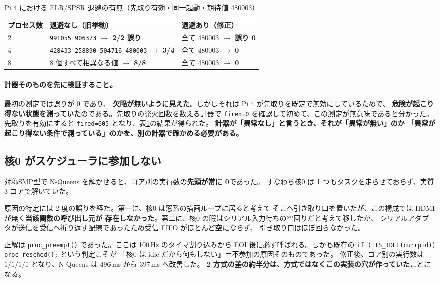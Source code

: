 \documentclass[a4paper,11pt]{ltjsarticle}
\begin{document}
\begin{table}[t]
\centering
\caption{Pi 4 における ELR/SPSR 退避の有無（先取り有効・同一起動・期待値 480003）}
\label{tab:elr}
\begin{tabular}{lll}
\toprule
プロセス数 & 退避なし（旧挙動） & 退避あり（修正） \\
\midrule
2 & \texttt{991055 906373} $\to$ \textbf{2/2 誤り} & 全て 480003 $\to$ \textbf{誤り 0} \\
4 & \texttt{428433 258890 504716 480003} $\to$ \textbf{3/4} & 全て 480003 $\to$ \textbf{0} \\
8 & 8 個すべて相異なる値 $\to$ \textbf{8/8} & 全て 480003 $\to$ \textbf{0} \\
\bottomrule
\end{tabular}
\end{table}

\paragraph{計器そのものを先に検証すること。}最初の測定では誤りが 0 であり、
\textbf{欠陥が無いように見えた}。しかしそれは Pi 4 が先取りを既定で無効にしているためで、
\textbf{危険が起こり得ない状態を測っていた}のである。先取りの発火回数を数える計器で
\texttt{fired=0} を確認して初めて、この測定が無意味であると分かった。
先取りを有効にすると \texttt{fired=605} となり、表\ref{tab:elr}の結果が得られた。
\textbf{計器が「異常なし」と言うとき、それが「異常が無い」のか
「異常が起こり得ない条件で測っている」のかを、別の計器で確かめる必要がある。}

\subsection{核0 がスケジューラに参加しない}
対称SMP型で N-Queens を解かせると、コア別の実行数の\textbf{先頭が常に 0}であった。
すなわち核0 は 1 つもタスクを走らせておらず、実質 3 コアで解いていた。

原因の特定には 2 度の誤りを経た。第一に、核0 は窓系の描画ループに居ると考えて
そこへ引き取り口を置いたが、この構成では HDMI が無く\textbf{当該関数の呼び出し元が
存在しなかった}。第二に、核0 の暇はシリアル入力待ちの空回りだと考えて移したが、
シリアルアダプタが送信を受信へ折り返す配線であったため受信 FIFO がほとんど空にならず、
引き取り口はほぼ回らなかった。

正解は \texttt{proc\_preempt()} であった。ここは 100\,Hz のタイマ割り込みから
EOI 後に必ず呼ばれる。しかも既存の
\texttt{if (!IS\_IDLE(currpid)) proc\_resched();} という判定こそが
「核0 は idle だから何もしない」＝不参加の原因そのものであった。
修正後、コア別の実行数は $1/1/1/1$ となり、N-Queens は 496\,ms から 397\,ms へ改善した。
\textbf{2 方式の差の約半分は、方式ではなくこの実装の穴が作っていた}ことになる。
\end{document}
